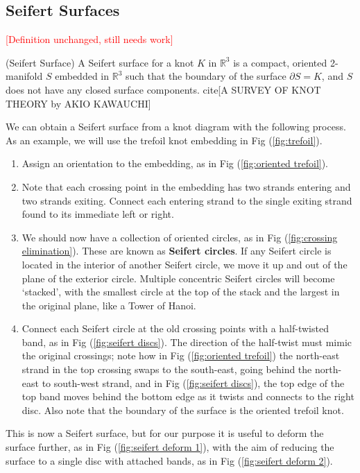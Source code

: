 \documentclass{article}
\begin{document}
{\subsection{Seifert Surfaces}
\textcolor{red}{[Definition unchanged, still needs work]}
\begin{definition}(Seifert Surface) A Seifert surface for a knot $K$ in $\mathbb{R}^3$ is a compact, oriented 2-manifold $S$ embedded in $\mathbb{R}^3$ such that the boundary of the surface $\partial S=K$, and $S$ does not have any closed surface components. cite[A SURVEY OF KNOT THEORY by AKIO KAWAUCHI]
\end{definition}
We can obtain a Seifert surface from a knot diagram with the following process. As an example, we will use the trefoil knot embedding in Fig (\ref{fig:trefoil}).
\begin{enumerate}
\item Assign an orientation to the embedding, as in Fig (\ref{fig:oriented trefoil}).
\item  Note that each crossing point in the embedding has two strands entering and two strands exiting. Connect each entering strand to the single exiting strand found to its immediate left or right.
\item We should now have a collection of oriented circles, as in Fig (\ref{fig:crossing elimination}). These are known as \textbf{Seifert circles}. If any Seifert circle is located in the interior of another Seifert circle, we move it up and out of the plane of the exterior circle. Multiple concentric Seifert circles will become `stacked', with the smallest circle at the top of the stack and the largest in the original plane, like a Tower of Hanoi.
\item Connect each Seifert circle at the old crossing points with a half-twisted band, as in Fig (\ref{fig:seifert discs}). The direction of the half-twist must mimic the original crossings; note how in Fig (\ref{fig:oriented trefoil}) the north-east strand in the top crossing swaps to the south-east, going behind the north-east to south-west strand, and in Fig (\ref{fig:seifert discs}), the top edge of the top band moves behind the bottom edge as it twists and connects to the right disc. Also note that the boundary of the surface is the oriented trefoil knot.
\end{enumerate}

 This is now a Seifert surface, but for our purpose it is useful to deform the surface further, as in Fig (\ref{fig:seifert deform 1}), with the aim of reducing the surface to a single disc with attached bands, as in Fig (\ref{fig:seifert deform 2}).

}
\end{document}
